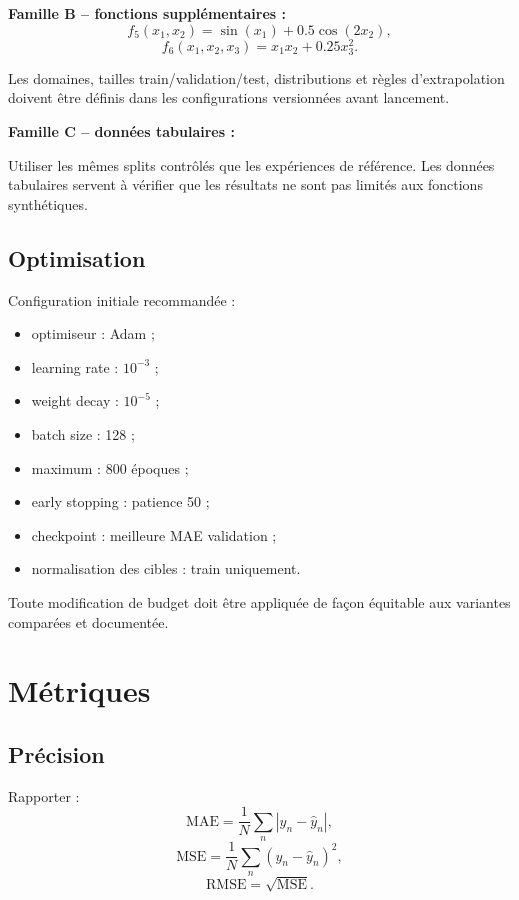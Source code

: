 \documentclass[11pt,a4paper]{article}
\begin{document}
\textbf{Famille B -- fonctions supplémentaires :}
\[
f_5(x_1,x_2)=\sin(x_1)+0.5\cos(2x_2),
\]
\[
f_6(x_1,x_2,x_3)=x_1x_2+0.25x_3^2.
\]

Les domaines, tailles train/validation/test, distributions et
règles d'extrapolation doivent être définis dans les configurations
versionnées avant lancement.

\textbf{Famille C -- données tabulaires :}

Utiliser les mêmes splits contrôlés que les expériences de référence.
Les données tabulaires servent à vérifier que les résultats ne sont
pas limités aux fonctions synthétiques.

\subsection{Optimisation}

Configuration initiale recommandée :
\begin{itemize}
  \item optimiseur : Adam ;
  \item learning rate : \(10^{-3}\) ;
  \item weight decay : \(10^{-5}\) ;
  \item batch size : 128 ;
  \item maximum : 800 époques ;
  \item early stopping : patience 50 ;
  \item checkpoint : meilleure MAE validation ;
  \item normalisation des cibles : train uniquement.
\end{itemize}

Toute modification de budget doit être appliquée de façon équitable
aux variantes comparées et documentée.

\section{Métriques}

\subsection{Précision}

Rapporter :
\[
\mathrm{MAE}=\frac{1}{N}\sum_n|y_n-\hat y_n|,
\]
\[
\mathrm{MSE}=\frac{1}{N}\sum_n(y_n-\hat y_n)^2,
\]
\[
\mathrm{RMSE}=\sqrt{\mathrm{MSE}}.
\]
\end{document}
